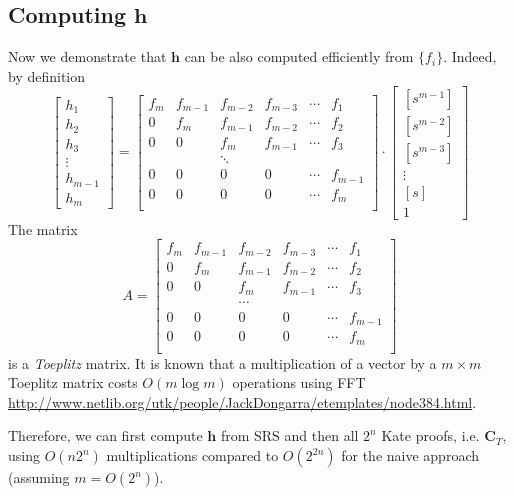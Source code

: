 \documentclass[a4paper]{article}
\begin{document}
\subsection{Computing $\mathbf{h}$}\label{sec:h}

Now we demonstrate that $\mathbf{h}$ can be also computed efficiently from $\{f_i\}$. Indeed, by definition
$$
\begin{bmatrix}
h_1\\
h_2\\
h_3\\
\vdots\\
h_{m-1}\\
h_m
\end{bmatrix}= \begin{bmatrix}
f_m &f_{m-1}&f_{m-2}&f_{m-3}&\cdots & f_1\\
0& f_m &f_{m-1}&f_{m-2}&\cdots & f_2\\
0 & 0& f_m &f_{m-1}&\cdots & f_3\\
&&\ddots&&&\\
0 & 0& 0 &0&\cdots & f_{m-1}\\
0 & 0& 0 &0&\cdots & f_m\\
\end{bmatrix}\cdot\begin{bmatrix}
[s^{m-1}]\\
[s^{m-2}]\\
[s^{m-3}]\\
\vdots\\
[s]\\
1
\end{bmatrix}
$$
The matrix 
$$
A = \begin{bmatrix}
f_m &f_{m-1}&f_{m-2}&f_{m-3}&\cdots & f_1\\
0& f_m &f_{m-1}&f_{m-2}&\cdots & f_2\\
0 & 0& f_m &f_{m-1}&\cdots & f_3\\
&&\cdots&&&\\
0 & 0& 0 &0&\cdots & f_{m-1}\\
0 & 0& 0 &0&\cdots & f_m\\
\end{bmatrix}
$$
is a \emph{Toeplitz} matrix. It is known that a multiplication of a vector by a $m\times m$ Toeplitz matrix costs $O(m\log m)$ operations using FFT \url{http://www.netlib.org/utk/people/JackDongarra/etemplates/node384.html}. 

Therefore, we can first compute $\mathbf{h}$ from SRS and then all  $2^n$ Kate proofs, i.e. $\mathbf{C}_T$, using $O(n2^n)$ multiplications compared to $O(2^{2n})$ for the naive approach (assuming $m = O(2^n)$).
\end{document}
